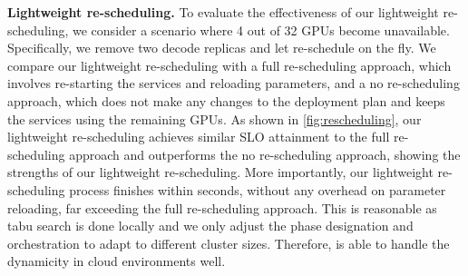 \noindent \textbf{Lightweight re-scheduling.}
To evaluate the effectiveness of our lightweight re-scheduling, we consider a scenario where 4 out of 32 GPUs become unavailable. Specifically, we remove two decode replicas and let \sys re-schedule on the fly. 
We compare our lightweight re-scheduling with  a full re-scheduling approach, which involves re-starting the services and reloading parameters, and  a no re-scheduling approach, which does not make any changes to the deployment plan and keeps the services using the remaining GPUs. 
% 
As shown in \autoref{fig:rescheduling}, our lightweight re-scheduling achieves similar SLO attainment to the full re-scheduling approach and outperforms the no re-scheduling approach, showing the strengths of our lightweight re-scheduling. 
More importantly, our lightweight re-scheduling process finishes within seconds, without any overhead on parameter reloading, far exceeding the full re-scheduling approach. This is reasonable as tabu search is done locally and we only adjust the phase designation and orchestration to adapt to different cluster sizes. 
Therefore, \sys is able to handle the dynamicity in cloud environments well.




